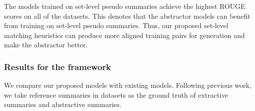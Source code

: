 The models trained on set-level pseudo summaries achieve the highest ROUGE scores on all of the datasets.
This denotes that the abstractor models 
can benefit from training on set-level pseudo summaries.
Thus, our proposed set-level matching heuristics can produce more aligned training pairs
for generation and make the abstractor better.


\subsubsection{Results for the framework}
We compare our proposed models with existing models.
Following previous work, we take reference summaries in datasets as
the ground truth of extractive summaries and abstractive summaries. 

